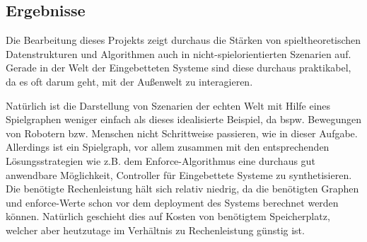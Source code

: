 \subsection{Ergebnisse}
Die Bearbeitung dieses Projekts zeigt durchaus die Stärken von spieltheoretischen Datenstrukturen und Algorithmen auch in nicht-spielorientierten Szenarien auf. Gerade in der Welt der Eingebetteten Systeme sind diese durchaus praktikabel, da es oft darum geht, mit der Außenwelt zu interagieren.\par
Natürlich ist die Darstellung von Szenarien der echten Welt mit Hilfe eines Spielgraphen weniger einfach als dieses idealisierte Beispiel, da bspw. Bewegungen von Robotern bzw. Menschen nicht Schrittweise passieren, wie in dieser Aufgabe. Allerdings ist ein Spielgraph, vor allem zusammen mit den entsprechenden Lösungsstrategien wie z.B. dem Enforce-Algorithmus eine durchaus gut anwendbare Möglichkeit, Controller für Eingebettete Systeme zu synthetisieren. Die benötigte Rechenleistung hält sich relativ niedrig, da die benötigten Graphen und enforce-Werte schon vor dem deployment des Systems berechnet werden können. Natürlich geschieht dies auf Kosten von benötigtem Speicherplatz, welcher aber heutzutage im Verhältnis zu Rechenleistung günstig ist.